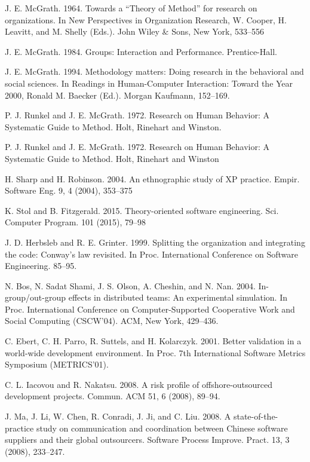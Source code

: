 \documentclass[runningheads]{llncs}
\begin{document}
\begin{thebibliography}{8}

J. E. McGrath. 1964. Towards a “Theory of Method” for research on organizations. In New Perspectives in Organization Research, W. Cooper, H. Leavitt, and M. Shelly (Eds.). John Wiley \& Sons, New York, 533–556

J. E. McGrath. 1984. Groups: Interaction and Performance. Prentice-Hall.

J. E. McGrath. 1994. Methodology matters: Doing research in the behavioral and social sciences. In Readings in Human-Computer Interaction: Toward the Year 2000, Ronald M. Baecker (Ed.). Morgan Kaufmann, 152–169.

P. J. Runkel and J. E. McGrath. 1972. Research on Human Behavior: A Systematic Guide to Method. Holt, Rinehart and
Winston.

P. J. Runkel and J. E. McGrath. 1972. Research on Human Behavior: A Systematic Guide to Method. Holt, Rinehart and
Winston

H. Sharp and H. Robinson. 2004. An ethnographic study of XP practice. Empir. Software Eng. 9, 4 (2004), 353–375

K. Stol and B. Fitzgerald. 2015. Theory-oriented software engineering. Sci. Computer Program. 101 (2015), 79–98

J. D. Herbsleb and R. E. Grinter. 1999. Splitting the organization and integrating the code: Conway’s law revisited. In Proc. International Conference on Software Engineering. 85–95.

N. Bos, N. Sadat Shami, J. S. Olson, A. Cheshin, and N. Nan. 2004. In-group/out-group effects in distributed teams:
An experimental simulation. In Proc. International Conference on Computer-Supported Cooperative Work and Social
Computing (CSCW’04). ACM, New York, 429–436.

C. Ebert, C. H. Parro, R. Suttels, and H. Kolarczyk. 2001. Better validation in a world-wide development environment.
In Proc. 7th International Software Metrics Symposium (METRICS’01).

C. L. Iacovou and R. Nakatsu. 2008. A risk profile of offshore-outsourced development projects. Commun. ACM 51,
6 (2008), 89–94.

J. Ma, J. Li, W. Chen, R. Conradi, J. Ji, and C. Liu. 2008. A state-of-the-practice study on communication and coordination between Chinese software suppliers and their global outsourcers. Software Process Improve. Pract. 13, 3
(2008), 233–247.


\end{thebibliography}
\end{document}
